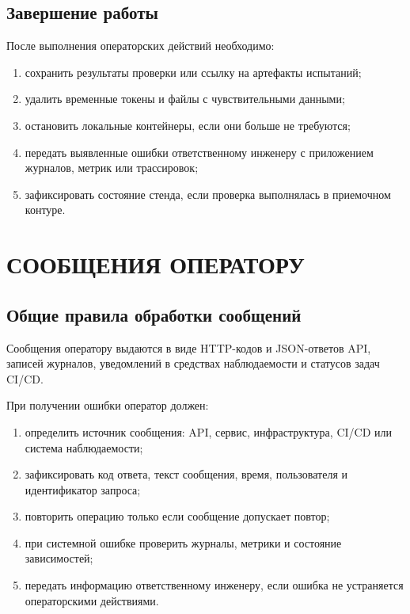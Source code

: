 \documentclass[12pt,a4paper]{extarticle}
\begin{document}
\subsection{Завершение работы}

\begin{hseExample}
После выполнения операторских действий необходимо:

\begin{enumerate}[label=\arabic*), leftmargin=1.25cm]
    \item сохранить результаты проверки или ссылку на артефакты испытаний;
    \item удалить временные токены и файлы с чувствительными данными;
    \item остановить локальные контейнеры, если они больше не требуются;
    \item передать выявленные ошибки ответственному инженеру с приложением журналов, метрик или трассировок;
    \item зафиксировать состояние стенда, если проверка выполнялась в приемочном контуре.
\end{enumerate}
\end{hseExample}

\clearpage

\section{СООБЩЕНИЯ ОПЕРАТОРУ}

\subsection{Общие правила обработки сообщений}

\begin{hseExample}
Сообщения оператору выдаются в виде HTTP-кодов и JSON-ответов API, записей журналов, уведомлений в средствах наблюдаемости и статусов задач CI/CD.

При получении ошибки оператор должен:

\begin{enumerate}[label=\arabic*), leftmargin=1.25cm]
    \item определить источник сообщения: API, сервис, инфраструктура, CI/CD или система наблюдаемости;
    \item зафиксировать код ответа, текст сообщения, время, пользователя и идентификатор запроса;
    \item повторить операцию только если сообщение допускает повтор;
    \item при системной ошибке проверить журналы, метрики и состояние зависимостей;
    \item передать информацию ответственному инженеру, если ошибка не устраняется операторскими действиями.
\end{enumerate}
\end{hseExample}
\end{document}
